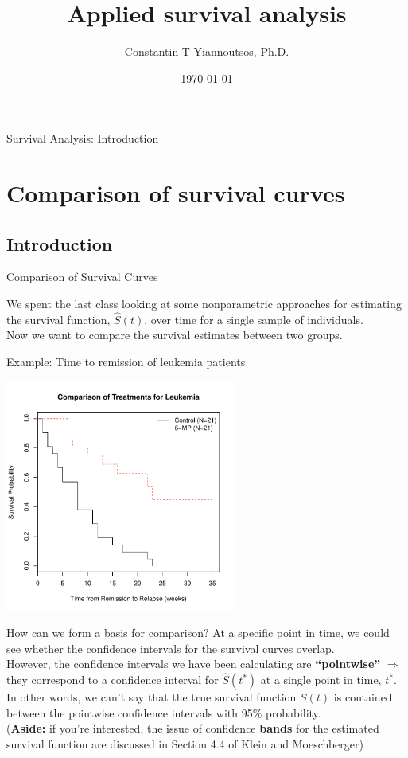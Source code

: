 \documentclass[envcountsect, 10pt, portrait, palatino]{beamer}
\title[]{Applied survival analysis}
\author[Constantin T Yiannoutsos]
{ Constantin T Yiannoutsos, Ph.D.}
\date[]{\today}
\begin{document}
\begin{frame}
  \titlepage
\end{frame}
\begin{frame}{Survival Analysis: Introduction}
  \tableofcontents
\end{frame}
\section{Comparison of survival curves}
\subsection{Introduction}
\begin{frame}{Comparison of Survival Curves}

\vspace{0.2in}
We spent the last class looking at some nonparametric
approaches for estimating the survival function,
$\hat{S}(t)$, over time for a single sample of individuals.
\\[2ex]
Now we want to compare the survival estimates between two
groups.
\end{frame}
\begin{frame}{Example:  Time to remission of leukemia patients}
\centerline{\includegraphics[width=3in]{surv_both.pdf}}
\end{frame}
\begin{frame}{How can we form a basis for comparison?}
At a specific point in time, we could see whether the confidence intervals for the survival curves overlap.
\\[2ex]
However, the confidence intervals we have been calculating are
{\bf ``pointwise''}  $\Rightarrow$ they correspond to a confidence
interval for $\hat{S}(t^*)$ at a single point in time, $t^{*}$.
\\[2ex]
In other words, we can't say that the true survival function
$S(t)$ is contained between the pointwise confidence intervals with 95\%
probability.
\\[2ex]
({\bf Aside:} if you're interested, the issue of confidence {\bf bands}
for the estimated survival function are discussed in Section 4.4 of
Klein and Moeschberger)
\end{frame}
\end{document}
